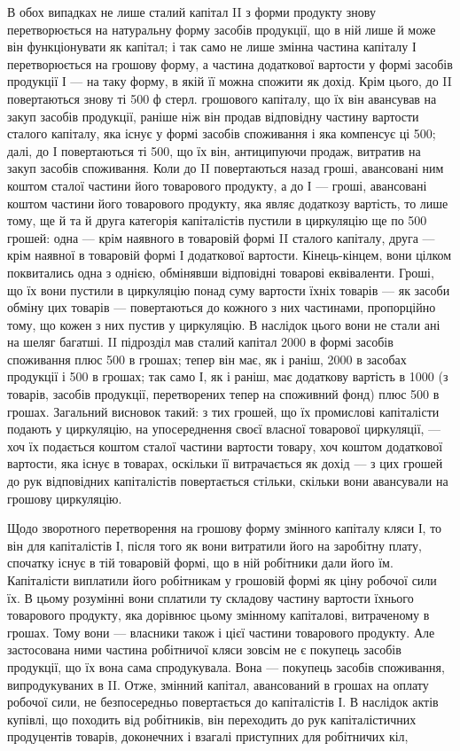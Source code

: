 В обох випадках не лише сталий капітал II з форми продукту знову
перетворюється на натуральну форму засобів продукції, що в ній лише
й може він функціонувати як капітал; і так само не лише змінна частина
капіталу І перетворюється на грошову форму, а частина додаткової вартости
у формі засобів продукції І — на таку форму, в якій її можна спожити
як дохід. Крім цього, до II повертаються знову ті 500 ф стерл. грошового
капіталу, що їх він авансував на закуп засобів продукції, раніше ніж він
продав відповідну частину вартости сталого капіталу, яка існує у формі
засобів споживання і яка компенсує ці 500; далі, до І повертаються
ті 500, що їх він, антиципуючи продаж, витратив на
закуп засобів споживання. Коли до II повертаються назад гроші, авансовані
ним коштом сталої частини його товарового продукту, а до І — гроші,
авансовані коштом частини його товарового продукту, яка являє додаткозу
вартість, то лише тому, ще й та й друга категорія капіталістів пустили
в циркуляцію ще по 500 грошей: одна — крім наявного
в товаровій формі II сталого капіталу, друга — крім наявної в товаровій
формі І додаткової вартости. Кінець-кінцем, вони цілком поквитались одна
з однією, обмінявши відповідні товарові еквіваленти. Гроші, що їх вони
пустили в циркуляцію понад суму вартости їхніх товарів — як засоби обміну
цих товарів — повертаються до кожного з них частинами, пропорційно
тому, що кожен з них пустив у циркуляцію. В наслідок цього вони не
стали ані на шеляг багатші. II підрозділ мав сталий капітал \deq{} 2000 в формі
засобів споживання плюс 500 в грошах; тепер він має, як і раніш, 2000
в засобах продукції і 500 в грошах; так само І, як і раніш, має додаткову
вартість в 1000 (з товарів, засобів продукції, перетворених тепер
на споживний фонд) плюс 500 в грошах. Загальний висновок такий:
з тих грошей, що їх промислові капіталісти подають у циркуляцію, на
упосереднення своєї власної товарової циркуляції, — хоч їх подається
коштом сталої частини вартости товару, хоч коштом додаткової вартости,
яка існує в товарах, оскільки її витрачається як дохід — з цих грошей до
рук відповідних капіталістів повертається стільки, скільки вони авансували
на грошову циркуляцію.

Щодо зворотного перетворення на грошову форму змінного капіталу
кляси І, то він для капіталістів І, після того як вони витратили його на
заробітну плату, спочатку існує в тій товаровій формі, що в ній робітники
дали його їм. Капіталісти виплатили його робітникам у грошовій
формі як ціну робочої сили їх. В цьому розумінні вони сплатили ту
складову частину вартости їхнього товарового продукту, яка дорівнює
цьому змінному капіталові, витраченому в грошах. Тому вони — власники також
і цієї частини товарового продукту. Але застосована ними частина робітничої
кляси зовсім не є покупець засобів продукції, що їх вона сама
спродукувала. Вона — покупець засобів споживання, випродукуваних в II.
Отже, змінний капітал, авансований в грошах на оплату робочої сили, не
безпосередньо повертається до капіталістів І. В наслідок актів купівлі,
що походить від робітників, він переходить до рук капіталістичних продуцентів
товарів, доконечних і взагалі приступних для робітничих кіл,
\parbreak{}  %
